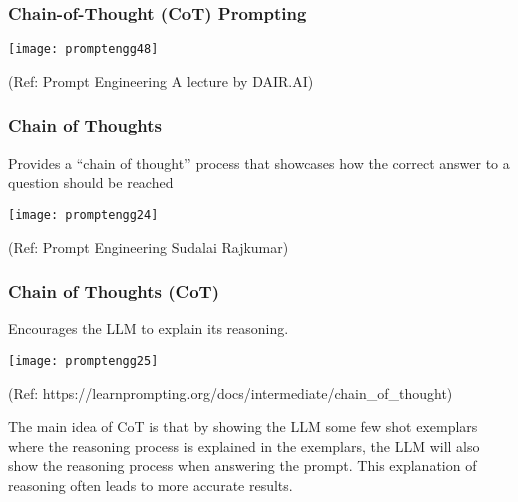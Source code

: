 \begin{frame}[fragile]\frametitle{Chain-of-Thought (CoT) Prompting}

\begin{center}
\texttt{[image: promptengg48]}

{\tiny (Ref: Prompt Engineering A lecture by DAIR.AI)}

\end{center}	

\end{frame}



\begin{frame}[fragile]\frametitle{Chain of Thoughts}

Provides a “chain of thought” process that 
showcases how the correct answer to a question should be reached

\begin{center}
\texttt{[image: promptengg24]}

{\tiny (Ref: Prompt Engineering Sudalai Rajkumar)}

\end{center}		

\end{frame}

\begin{frame}[fragile]\frametitle{Chain of Thoughts (CoT)}

Encourages the LLM to explain its reasoning. 

\begin{center}
\texttt{[image: promptengg25]}

{\tiny (Ref: https://learnprompting.org/docs/intermediate/chain\_of\_thought)}

\end{center}		

The main idea of CoT is that by showing the LLM some few shot exemplars where the reasoning process is explained in the exemplars, the LLM will also show the reasoning process when answering the prompt. This explanation of reasoning often leads to more accurate results.

\end{frame}



